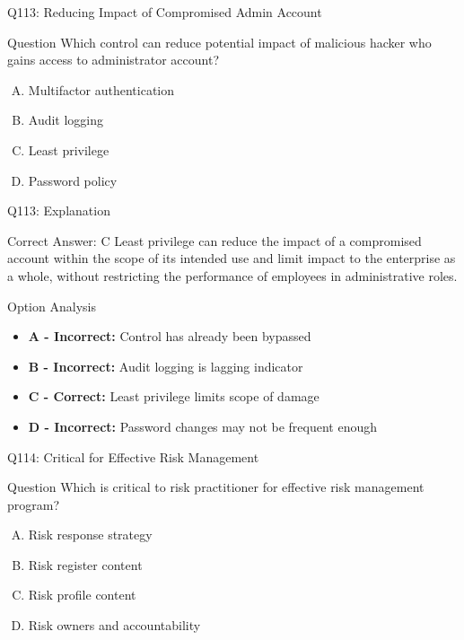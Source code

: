 \documentclass{beamer}
\begin{document}
	\begin{frame}{Q113: Reducing Impact of Compromised Admin Account}
		\begin{block}{Question}
			Which control can reduce potential impact of malicious hacker who gains access to administrator account?
		\end{block}
		\begin{enumerate}[(A)]
			\item Multifactor authentication
			\item Audit logging
			\item Least privilege
			\item Password policy
		\end{enumerate}
	\end{frame}
	
	\begin{frame}{Q113: Explanation}
		\begin{block}{Correct Answer: C}
			Least privilege can reduce the impact of a compromised account within the scope of its intended use and limit impact to the enterprise as a whole, without restricting the performance of employees in administrative roles.
		\end{block}
		\begin{block}{Option Analysis}
			\begin{itemize}
				\item \textbf{A - Incorrect:} Control has already been bypassed
				\item \textbf{B - Incorrect:} Audit logging is lagging indicator
				\item \textbf{C - Correct:} Least privilege limits scope of damage
				\item \textbf{D - Incorrect:} Password changes may not be frequent enough
			\end{itemize}
		\end{block}
	\end{frame}
	
	\begin{frame}{Q114: Critical for Effective Risk Management}
		\begin{block}{Question}
			Which is critical to risk practitioner for effective risk management program?
		\end{block}
		\begin{enumerate}[(A)]
			\item Risk response strategy
			\item Risk register content
			\item Risk profile content
			\item Risk owners and accountability
		\end{enumerate}
	\end{frame}
	
\end{document}

